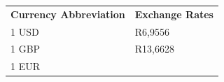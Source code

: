 {{\begin{center}
\begin{xtabular}[t]{|l|l|}
    
        
                    \textbf{Currency Abbreviation}
                   &
    
    
        
                    \textbf{Exchange Rates}
     \tabularnewline{}
    
    
        1 USD &
    
    
        R6,9556%
     \tabularnewline{}
    
    
        1 GBP &
    
    
        R13,6628%
     \tabularnewline{}
    
    
        1 EUR &
    

\end{xtabular}
\end{center}}}
